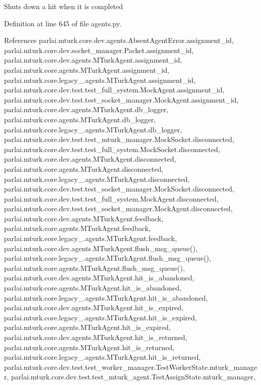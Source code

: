 \begin{DoxyVerb}Shuts down a hit when it is completed\end{DoxyVerb}
 

Definition at line 645 of file agents.\+py.



References parlai.\+mturk.\+core.\+dev.\+agents.\+Absent\+Agent\+Error.\+assignment\+\_\+id, parlai.\+mturk.\+core.\+dev.\+socket\+\_\+manager.\+Packet.\+assignment\+\_\+id, parlai.\+mturk.\+core.\+dev.\+agents.\+M\+Turk\+Agent.\+assignment\+\_\+id, parlai.\+mturk.\+core.\+agents.\+M\+Turk\+Agent.\+assignment\+\_\+id, parlai.\+mturk.\+core.\+legacy\+\_.\+agents.\+M\+Turk\+Agent.\+assignment\+\_\+id, parlai.\+mturk.\+core.\+dev.\+test.\+test\+\_\+full\+\_\+system.\+Mock\+Agent.\+assignment\+\_\+id, parlai.\+mturk.\+core.\+dev.\+test.\+test\+\_\+socket\+\_\+manager.\+Mock\+Agent.\+assignment\+\_\+id, parlai.\+mturk.\+core.\+dev.\+agents.\+M\+Turk\+Agent.\+db\+\_\+logger, parlai.\+mturk.\+core.\+agents.\+M\+Turk\+Agent.\+db\+\_\+logger, parlai.\+mturk.\+core.\+legacy\+\_.\+agents.\+M\+Turk\+Agent.\+db\+\_\+logger, parlai.\+mturk.\+core.\+dev.\+test.\+test\+\_\+mturk\+\_\+manager.\+Mock\+Socket.\+disconnected, parlai.\+mturk.\+core.\+dev.\+test.\+test\+\_\+full\+\_\+system.\+Mock\+Socket.\+disconnected, parlai.\+mturk.\+core.\+dev.\+agents.\+M\+Turk\+Agent.\+disconnected, parlai.\+mturk.\+core.\+agents.\+M\+Turk\+Agent.\+disconnected, parlai.\+mturk.\+core.\+legacy\+\_.\+agents.\+M\+Turk\+Agent.\+disconnected, parlai.\+mturk.\+core.\+dev.\+test.\+test\+\_\+socket\+\_\+manager.\+Mock\+Socket.\+disconnected, parlai.\+mturk.\+core.\+dev.\+test.\+test\+\_\+full\+\_\+system.\+Mock\+Agent.\+disconnected, parlai.\+mturk.\+core.\+dev.\+test.\+test\+\_\+socket\+\_\+manager.\+Mock\+Agent.\+disconnected, parlai.\+mturk.\+core.\+dev.\+agents.\+M\+Turk\+Agent.\+feedback, parlai.\+mturk.\+core.\+agents.\+M\+Turk\+Agent.\+feedback, parlai.\+mturk.\+core.\+legacy\+\_.\+agents.\+M\+Turk\+Agent.\+feedback, parlai.\+mturk.\+core.\+dev.\+agents.\+M\+Turk\+Agent.\+flush\+\_\+msg\+\_\+queue(), parlai.\+mturk.\+core.\+legacy\+\_.\+agents.\+M\+Turk\+Agent.\+flush\+\_\+msg\+\_\+queue(), parlai.\+mturk.\+core.\+agents.\+M\+Turk\+Agent.\+flush\+\_\+msg\+\_\+queue(), parlai.\+mturk.\+core.\+dev.\+agents.\+M\+Turk\+Agent.\+hit\+\_\+is\+\_\+abandoned, parlai.\+mturk.\+core.\+agents.\+M\+Turk\+Agent.\+hit\+\_\+is\+\_\+abandoned, parlai.\+mturk.\+core.\+legacy\+\_.\+agents.\+M\+Turk\+Agent.\+hit\+\_\+is\+\_\+abandoned, parlai.\+mturk.\+core.\+dev.\+agents.\+M\+Turk\+Agent.\+hit\+\_\+is\+\_\+expired, parlai.\+mturk.\+core.\+legacy\+\_.\+agents.\+M\+Turk\+Agent.\+hit\+\_\+is\+\_\+expired, parlai.\+mturk.\+core.\+agents.\+M\+Turk\+Agent.\+hit\+\_\+is\+\_\+expired, parlai.\+mturk.\+core.\+dev.\+agents.\+M\+Turk\+Agent.\+hit\+\_\+is\+\_\+returned, parlai.\+mturk.\+core.\+agents.\+M\+Turk\+Agent.\+hit\+\_\+is\+\_\+returned, parlai.\+mturk.\+core.\+legacy\+\_.\+agents.\+M\+Turk\+Agent.\+hit\+\_\+is\+\_\+returned, parlai.\+mturk.\+core.\+dev.\+test.\+test\+\_\+worker\+\_\+manager.\+Test\+Worker\+State.\+mturk\+\_\+manager, parlai.\+mturk.\+core.\+dev.\+test.\+test\+\_\+mturk\+\_\+agent.\+Test\+Assign\+State.\+mturk\+\_\+manager, 